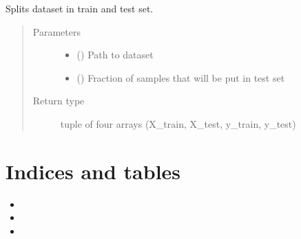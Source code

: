 \documentclass[letterpaper,10pt,english]{sphinxmanual}
\begin{document}
\begin{fulllineitems}
\begin{fulllineitems}
\begin{quote}
\begin{description}
\begin{itemize}
\end{itemize}

\end{description}\end{quote}

\end{fulllineitems}


\begin{fulllineitems}
\label{\detokenize{shared:mleap.shared.files_io.FilesIO.split_dataset}}
Splits dataset in train and test set.
\begin{quote}\begin{description}
\item[{Parameters}] \leavevmode\begin{itemize}
\item {} 
 () \textendash{} Path to dataset

\item {} 
 () \textendash{} Fraction of samples that will be put in test set

\end{itemize}

\item[{Return type}] \leavevmode
tuple of four arrays (X\_train, X\_test, y\_train, y\_test)

\end{description}\end{quote}

\end{fulllineitems}


\end{fulllineitems}



\chapter{Indices and tables}
\label{\detokenize{index:indices-and-tables}}\begin{itemize}
\item {} 

\item {} 

\item {} 

\end{itemize}
\end{document}
